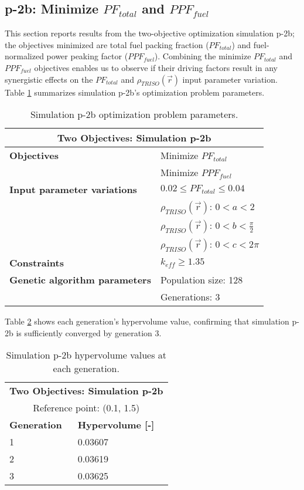 \subsection{p-2b: Minimize $PF_{total}$ and $PPF_{fuel}$}
\label{sec:p-2b}
This section reports results from the two-objective optimization simulation p-2b; the 
objectives minimized are total fuel packing fraction ($PF_{total}$) and fuel-normalized 
power peaking factor ($PPF_{fuel}$).  
Combining the minimize $PF_{total}$ and $PPF_{fuel}$ objectives enables us to observe if 
their driving factors result in any synergistic effects on the $PF_{total}$ and 
$\rho_{TRISO}(\vec{r})$ input parameter variation. 
Table \ref{tab:simulationp2b} summarizes simulation p-2b's optimization problem parameters. 
\begin{table}[htbp!]
    \centering
    \onehalfspacing
    \caption{Simulation p-2b optimization problem parameters.}
	\label{tab:simulationp2b}
    \footnotesize
    \begin{tabular}{l|p{4cm}}
    \hline 
    \multicolumn{2}{c}{\textbf{Two Objectives: Simulation p-2b}} \\
    \hline 
    \textbf{Objectives} & Minimize $PF_{total}$ \\
    & Minimize $PPF_{fuel}$ \\
    \hline 
    \textbf{Input parameter variations} & $0.02 \leq PF_{total} \leq 0.04$ \\
    & $\rho_{TRISO}(\vec{r})$: $0<a<2$ \\
    & $\rho_{TRISO}(\vec{r})$: $0<b<\frac{\pi}{2}$ \\
    & $\rho_{TRISO}(\vec{r})$: $0<c<2\pi$ \\
    \hline
    \textbf{Constraints} & $k_{eff} \geq 1.35$\\ 
    \hline 
    \textbf{Genetic algorithm parameters} & Population size: 128 \\
    & Generations: 3 \\
    \hline
    \end{tabular}
\end{table}

Table \ref{tab:p2b-hypervolume} shows each generation's hypervolume value, 
confirming that simulation p-2b is sufficiently converged by generation 3. 
\begin{table}[htbp!]
    \centering
    \onehalfspacing
    \caption{Simulation p-2b hypervolume values at each generation.}
	\label{tab:p2b-hypervolume}
    \footnotesize
    \begin{tabular}{ll}
    \hline 
    \multicolumn{2}{c}{\textbf{Two Objectives: Simulation p-2b}} \\
    \multicolumn{2}{c}{Reference point: (0.1, 1.5)} \\
    \hline 
    \textbf{Generation} & \textbf{Hypervolume [-]} \\
    \hline
    1 & 0.03607 \\
    2 & 0.03619 \\
    3 & 0.03625 \\
    \hline
    \end{tabular}
\end{table}

